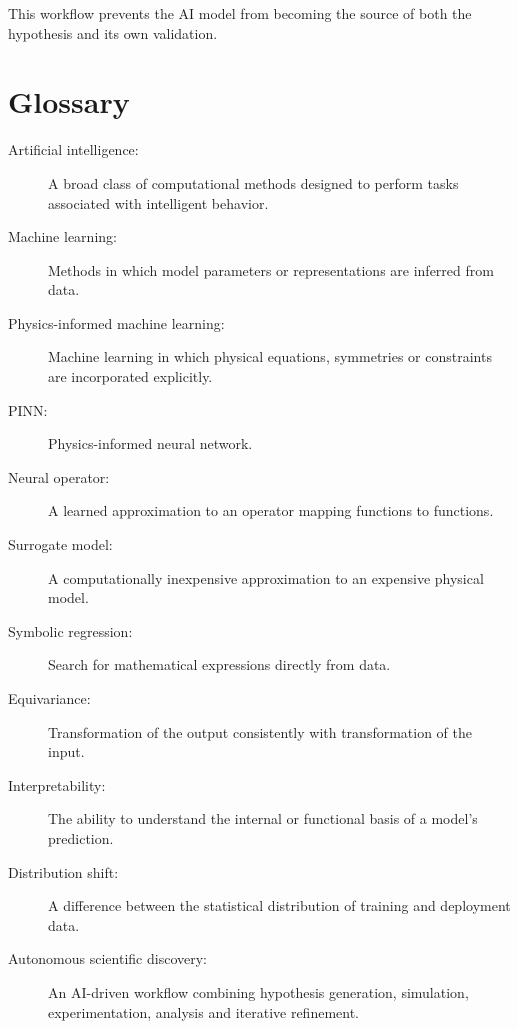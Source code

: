 \documentclass[11pt,a4paper,oneside]{book}
\begin{document}
This workflow prevents the AI model from becoming the source of both the
hypothesis and its own validation.

\chapter{Glossary}

\begin{description}

\item[Artificial intelligence:]
A broad class of computational methods designed to perform tasks associated
with intelligent behavior.

\item[Machine learning:]
Methods in which model parameters or representations are inferred from data.

\item[Physics-informed machine learning:]
Machine learning in which physical equations, symmetries or constraints are
incorporated explicitly.

\item[PINN:]
Physics-informed neural network.

\item[Neural operator:]
A learned approximation to an operator mapping functions to functions.

\item[Surrogate model:]
A computationally inexpensive approximation to an expensive physical model.

\item[Symbolic regression:]
Search for mathematical expressions directly from data.

\item[Equivariance:]
Transformation of the output consistently with transformation of the input.

\item[Interpretability:]
The ability to understand the internal or functional basis of a model's
prediction.

\item[Distribution shift:]
A difference between the statistical distribution of training and deployment
data.

\item[Autonomous scientific discovery:]
An AI-driven workflow combining hypothesis generation, simulation,
experimentation, analysis and iterative refinement.

\end{description}
\end{document}
